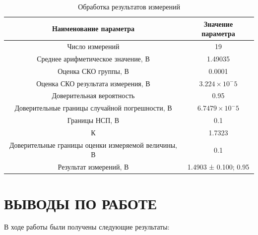 \documentclass[a4paper,14pt]{article}
\begin{document}
\begin{table}[H]
	\centering
	\caption{Обработка результатов измерений }
	\label{tab:mm_train}
	\begin{tabular}{|c|c|}
		\hline
		              Наименование параметра                &  Значение параметра   \\ \hline
		                  Число измерений                   &          19           \\ \hline
		        Среднее арифметическое значение, В          &        1.49035        \\ \hline
		               Оценка СКО группы, В                 &        0.0001         \\ \hline
		        Оценка СКО результата измерения, В          & $3.224 \times 10^-5$  \\ \hline
		             Доверительная вероятность              &         0.95          \\ \hline
		  Доверительные границы случайной погрешности, В    & $6.7479 \times 10^-5$ \\ \hline
		                  Границы НСП, В                    &          0.1          \\ \hline
		                         К                          &        1.7323         \\ \hline
		Доверительные границы оценки измеряемой величины, В &          0.1          \\ \hline
		              Результат измерений, В                & 1.4903 ± 0.100; 0.95  \\ \hline
	\end{tabular}
\end{table}
\section{ВЫВОДЫ ПО РАБОТЕ}

В ходе работы были получены следующие результаты:
\end{document}
